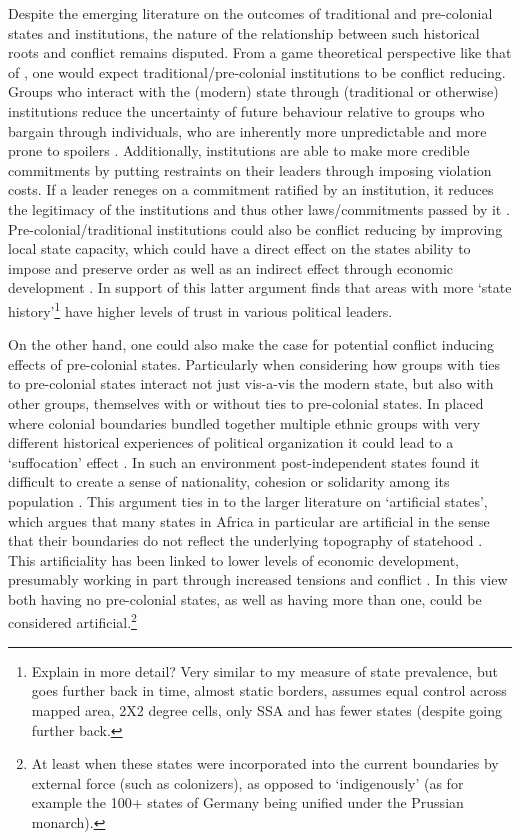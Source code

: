 \documentclass[12pt]{article}
\begin{document}
Despite the emerging literature on the outcomes of traditional and pre-colonial
states and institutions, the nature of the relationship between such historical
roots and conflict remains disputed. From a game theoretical perspective like
that of \citet{Fearon1995}, one would expect traditional/pre-colonial
institutions to be conflict reducing. Groups who interact with the (modern)
state through (traditional or otherwise) institutions reduce the uncertainty of
future behaviour relative to groups who bargain through individuals, who are
inherently more unpredictable and more prone to spoilers \citep{Wig2016}.
Additionally, institutions are able to make more credible commitments by putting
restraints on their leaders through imposing violation costs. If a leader
reneges on a commitment ratified by an institution, it reduces the legitimacy of
the institutions and thus other laws/commitments passed by it \citep{Wig2016}.
Pre-colonial/traditional institutions could also be conflict reducing by
improving local state capacity, which could have a direct effect on the states
ability to impose and preserve order as well as an indirect effect through
economic development \citep{Depetris-Chauvin2016}. In support of this latter
argument \citet{Depetris-Chauvin2016} finds that areas with more `state
history'\footnote{Explain in more detail? Very similar to my measure of state
	prevalence, but goes further back in time, almost static borders,
assumes equal control across mapped area, 2X2 degree cells, only SSA and has
fewer states (despite going further back.} have higher levels of trust in
various political leaders.

On the other hand, one could also make the case for potential conflict inducing
effects of pre-colonial states. Particularly when considering how groups with
ties to pre-colonial states interact not just vis-a-vis the modern state, but
also with other groups, themselves with or without ties to pre-colonial states.
In placed where colonial boundaries bundled together multiple ethnic groups with
very different historical experiences of political organization it could lead to
a `suffocation' effect \citep{Englebert2002}. In such an environment
post-independent states found it difficult to create a sense of nationality,
cohesion or solidarity among its population \citep{Englebert2002}. This argument
ties in to the larger literature on `artificial states', which argues that many
states in Africa in particular are artificial in the sense that their boundaries
do not reflect the underlying topography of statehood \citep{Alesina2011}. This
artificiality has been linked to lower levels of economic development,
presumably working in part through increased tensions and conflict
\citep{Alesina2011}. In this view both having no pre-colonial states, as well as
having more than one, could be considered artificial.\footnote{At least when
	these states were incorporated into the current boundaries by external
force (such as colonizers), as opposed to `indigenously' (as for example the
100+ states of Germany being unified under the Prussian monarch).}
\end{document}
